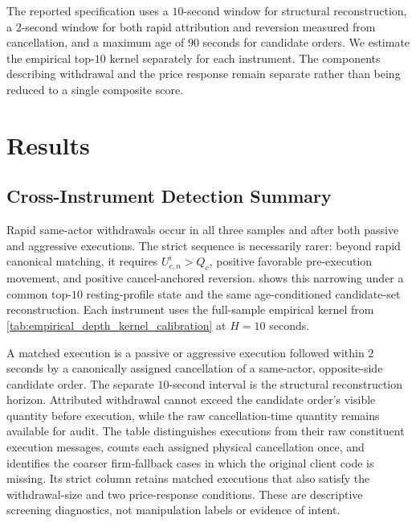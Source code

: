 \documentclass[11pt]{article}
\newenvironment{review}{\begingroup\color{blue}}{\endgroup}
\begin{document}
\begin{review}The reported specification uses a $10$-second window for structural reconstruction, a $2$-second window for both rapid attribution and reversion measured from cancellation, and a maximum age of $90$ seconds for candidate orders.\end{review} We estimate the empirical top-$10$ kernel separately for each
instrument. \begin{review}The components describing withdrawal and the price response\end{review} remain separate rather than being reduced to \begin{review}a single composite score\end{review}.

\section{Results}
\label{sec:results}

\subsection{Cross-Instrument Detection Summary}
\label{subsec:cross_instrument_results}

Rapid same-actor withdrawals occur in all three samples and after both passive and aggressive executions. The strict
sequence is necessarily rarer: beyond rapid canonical matching, it requires $U^{i}_{c,n}>Q_c$, positive favorable
pre-execution movement, and positive cancel-anchored reversion.  shows this
narrowing under a common top-$10$ resting-profile state and the same age-conditioned candidate-set reconstruction. Each
instrument uses the full-sample empirical kernel from \cref{tab:empirical_depth_kernel_calibration} at $H=10$ seconds.

A matched execution is a passive or aggressive execution followed within $2$ seconds by a canonically assigned cancellation
of a same-actor, opposite-side candidate order. The separate $10$-second interval is the structural reconstruction horizon.
Attributed withdrawal cannot exceed the candidate order's visible quantity before execution, while the raw
cancellation-time quantity remains available for audit. The table distinguishes executions from their raw constituent
execution messages, counts each assigned physical cancellation once, and identifies the coarser firm-fallback cases in
which the original client code is missing. Its strict column retains matched executions that also satisfy the withdrawal-size
and two price-response conditions. These are descriptive screening diagnostics, not manipulation labels or evidence of intent.
\end{document}
